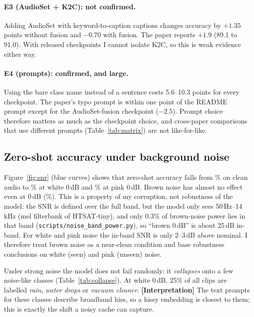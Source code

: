 \paragraph{E3 (AudioSet + K2C): not confirmed.}
Adding AudioSet with keyword-to-caption captions changes accuracy by $+1.35$ points without fusion and $-0.70$ with fusion. The paper reports $+1.9$ (89.1 to 91.0).
With released checkpoints I cannot isolate K2C, so this is weak evidence either way.

\paragraph{E4 (prompts): confirmed, and large.}
Using the bare class name instead of a sentence costs 5.6--10.3 points for every checkpoint. The paper's typo prompt is within one point of the README prompt except for the AudioSet-fusion checkpoint ($-2.5$).
Prompt choice therefore matters as much as the checkpoint choice, and cross-paper comparisons that use different prompts (Table~\ref{tab:matrix}) are not like-for-like.

\subsection{Zero-shot accuracy under background noise}

Figure~\ref{fig:snr} (blue curves) shows that zero-shot accuracy falls from \acczsKsixteenclean\% on clean audio to \acczsKsixteenwhitezerodb\% at white 0\,dB and \acczsKsixteenpinkzerodb\% at pink 0\,dB.
Brown noise has almost no effect even at 0\,dB (\acczsKsixteenbrownzerodb\%). This is a property of my corruption, not robustness of the model:
the SNR is defined over the full band, but the model only sees 50\,Hz--14\,kHz (mel filterbank of HTSAT-tiny), and only 0.3\% of brown-noise power lies in that band
(\texttt{scripts/noise\_band\_power.py}), so ``brown 0\,dB'' is about 25\,dB in-band. For white and pink noise the in-band SNR is only 2--3\,dB above nominal.
I therefore treat brown noise as a near-clean condition and base robustness conclusions on white (seen) and pink (unseen) noise.

Under strong noise the model does not fail randomly: it \emph{collapses} onto a few noise-like classes (Table~\ref{tab:collapse}).
At white 0\,dB, 25\% of all clips are labelled \emph{rain}, \emph{water drops} or \emph{vacuum cleaner}.
\textbf{[Interpretation]} The text prompts for these classes describe broadband hiss, so a hissy embedding is closest to them; this is exactly the shift a noisy cache can capture.

